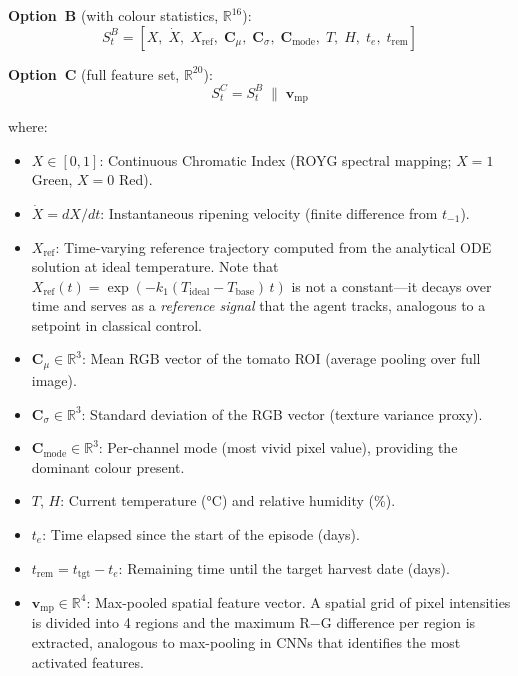 \documentclass[conference]{IEEEtran}
\begin{document}
    \textbf{Option~B} (with colour statistics, $\mathbb{R}^{16}$):
    \begin{equation}
    S_t^B = \left[
    X,\; \dot{X},\; X_{\text{ref}},\;
    \mathbf{C}_{\mu},\; \mathbf{C}_{\sigma},\; \mathbf{C}_{\text{mode}},\;
    T,\; H,\; t_e,\; t_{\text{rem}}
    \right]
    \label{eq:state}
    \end{equation}

    \textbf{Option~C} (full feature set, $\mathbb{R}^{20}$):
    \begin{equation}
    S_t^C = S_t^B \;\|\; \mathbf{v}_{\text{mp}}
    \end{equation}

    \noindent where:
    \begin{itemize}
        \item $X \in [0, 1]$: Continuous Chromatic Index (ROYG spectral mapping; $X{=}1$ Green, $X{=}0$ Red).
        \item $\dot{X} = dX/dt$: Instantaneous ripening velocity (finite difference from $t_{-1}$).
        \item $X_{\text{ref}}$: Time-varying reference trajectory computed from the analytical ODE solution at ideal temperature.  Note that $X_{\text{ref}}(t) = \exp(-k_1(T_{\text{ideal}} - T_{\text{base}})\,t)$ is not a constant---it decays over time and serves as a \emph{reference signal} that the agent tracks, analogous to a setpoint in classical control.
        \item $\mathbf{C}_{\mu} \in \mathbb{R}^3$: Mean RGB vector of the tomato ROI (average pooling over full image).
        \item $\mathbf{C}_{\sigma} \in \mathbb{R}^3$: Standard deviation of the RGB vector (texture variance proxy).
        \item $\mathbf{C}_{\text{mode}} \in \mathbb{R}^3$: Per-channel mode (most vivid pixel value), providing the dominant colour present.
        \item $T$, $H$: Current temperature (°C) and relative humidity (\%).
        \item $t_e$: Time elapsed since the start of the episode (days).
        \item $t_{\text{rem}} = t_{\text{tgt}} - t_e$: Remaining time until the target harvest date (days).
        \item $\mathbf{v}_{\text{mp}} \in \mathbb{R}^{4}$: Max-pooled spatial feature vector.  A spatial grid of pixel intensities is divided into 4 regions and the maximum R$-$G difference per region is extracted, analogous to max-pooling in CNNs that identifies the most activated features.
    \end{itemize}
\end{document}
